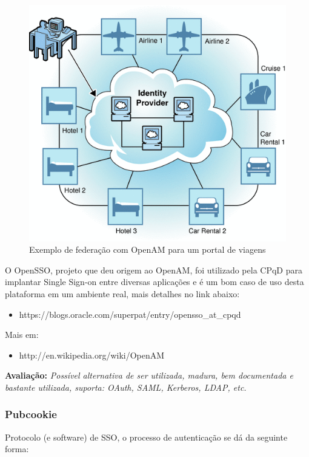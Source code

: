 \documentclass[11pt]{article}
\begin{document}
\begin{figure}[h]
\center
\includegraphics[scale=0.5]{opensso.png}
\caption{Exemplo de federação com OpenAM para um portal de viagens}
\label{fig:opensso}
\end{figure}

O OpenSSO, projeto que deu origem ao OpenAM, foi utilizado pela CPqD para
implantar Single Sign-on entre diversas aplicações e é um bom caso de uso
desta plataforma em um ambiente real, mais detalhes no link abaixo:

\begin{itemize}
  \item{https://blogs.oracle.com/superpat/entry/opensso\_at\_cpqd}
\end{itemize}

Mais em:
\begin{itemize}
  \item{http://en.wikipedia.org/wiki/OpenAM}
\end{itemize}

{\bf Avaliação:} {\it Possível alternativa de ser utilizada, madura, bem
documentada e bastante utilizada, suporta: OAuth, SAML, Kerberos, LDAP, etc.}

\subsubsection{Pubcookie}

Protocolo (e software) de SSO, o processo de autenticação se dá da seguinte
forma:
\end{document}
